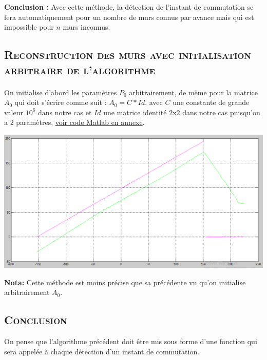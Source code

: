    \par \textbf{Conclusion :} Avec cette méthode, la détection de l'instant de commutation se fera automatiquement pour un nombre de murs connus par avance mais qui est impossible pour $n$ murs inconnus.\\
      
\subsection{\textsc{ Reconstruction des murs avec initialisation arbitraire de l'algorithme}}

	\paragraph{} On initialise d'abord les paramètres $P_0$ arbitrairement, de même pour la matrice $A_0$ qui doit s'écrire comme suit : $A_0 = C*Id$, avec $C$ une constante de grande valeur $10^{6}$ dans notre cas et $Id$ une matrice identité $2$x$2$ dans notre cas puisqu'on a $2$ paramètres, \label{section 1.3.4} \hyperref[Annexe E] {voir code Matlab en annexe}. \\
	
		\begin{center}
	\includegraphics[scale=0.5]{E.PNG}
	\label{fig7} 
	\end{center}
	   
	\textbf{Nota:} Cette méthode est moins précise que sa précédente vu qu'on initialise arbitrairement $A_0$.	   
	   
\subsection{\textsc{ Conclusion }}

	On pense que l'algorithme précédent doit être mis sous forme d'une fonction qui sera appelée à chaque détection d'un instant de commutation.
	  